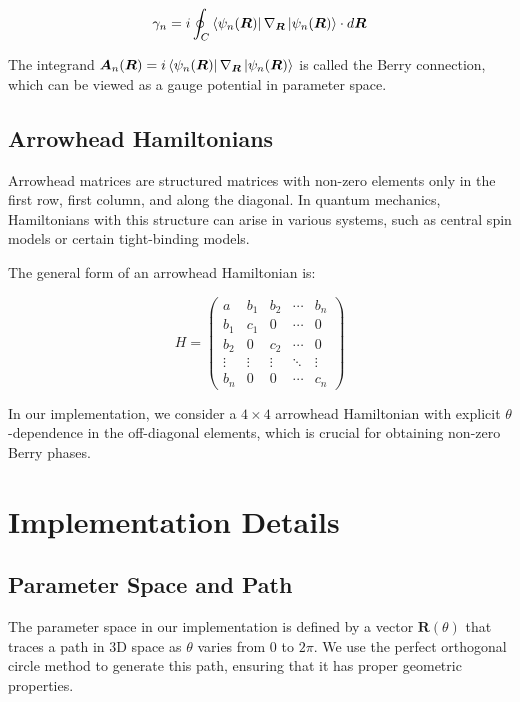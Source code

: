 \documentclass[12pt,a4paper]{article}
\begin{document}
\begin{equation}
\gamma_n = i \oint_C \bra{\psi_n(\bm{R})} \nabla_{\bm{R}} \ket{\psi_n(\bm{R})} \cdot d\bm{R}
\end{equation}

The integrand $\bm{A}_n(\bm{R}) = i \bra{\psi_n(\bm{R})} \nabla_{\bm{R}} \ket{\psi_n(\bm{R})}$ is called the Berry connection, which can be viewed as a gauge potential in parameter space.

\subsection{Arrowhead Hamiltonians}

Arrowhead matrices are structured matrices with non-zero elements only in the first row, first column, and along the diagonal. In quantum mechanics, Hamiltonians with this structure can arise in various systems, such as central spin models or certain tight-binding models.

The general form of an arrowhead Hamiltonian is:

\begin{equation}
H = \begin{pmatrix}
a & b_1 & b_2 & \cdots & b_n \\
b_1 & c_1 & 0 & \cdots & 0 \\
b_2 & 0 & c_2 & \cdots & 0 \\
\vdots & \vdots & \vdots & \ddots & \vdots \\
b_n & 0 & 0 & \cdots & c_n
\end{pmatrix}
\end{equation}

In our implementation, we consider a $4 \times 4$ arrowhead Hamiltonian with explicit $\theta$-dependence in the off-diagonal elements, which is crucial for obtaining non-zero Berry phases.

\section{Implementation Details}

\subsection{Parameter Space and Path}

The parameter space in our implementation is defined by a vector $\bm{R}(\theta)$ that traces a path in 3D space as $\theta$ varies from 0 to $2\pi$. We use the perfect orthogonal circle method to generate this path, ensuring that it has proper geometric properties.
\end{document}
